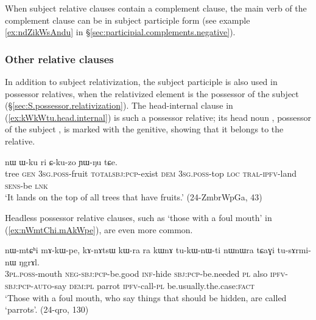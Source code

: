 
When subject relative clauses contain a complement clause, the main verb of the complement clause can be in subject participle form (see example \ref{ex:ndZikWsAndu}  in §\ref{sec:participial.complements.negative}).
 
\subsubsection{Other relative clauses}  \label{sec:subject.participle.other.relative}
In addition to subject relativization, the subject participle is also used in possessor relatives, when the relativized element is the possessor of the subject (§\ref{sec:S.possessor.relativization}).  The head-internal clause in (\ref{ex:kWkWtu.head.internal}) is such a possessor relative; its head noun , possessor of the subject ,  is marked with the genitive, showing that it belongs to the relative.  

\begin{exe}
\ex \label{ex:kWkWtu.head.internal}
  nɯ ɯ-ku ri ɕ-ku-zo ɲɯ-ŋu tɕe. \\
 tree \textsc{gen} \textsc{3sg}.\textsc{poss}-fruit \textsc{total}\redp{}\textsc{sbj}:\textsc{pcp}-exist \textsc{dem} \textsc{3sg}.\textsc{poss}-top \textsc{loc} \textsc{tral}-\textsc{ipfv}-land \textsc{sens}-be \textsc{lnk} \\
 \glt `It lands on the top of all trees that have fruits.' (24-ZmbrWpGa, 43)
\end{exe}

 Headless possessor relative clauses, such as   `those with a foul mouth' in (\ref{ex:nWmtChi.mAkWpe}), are even more common.

\begin{exe}
\ex \label{ex:nWmtChi.mAkWpe}
\gll nɯ-mtɕʰi mɤ-kɯ-pe, kɤ-nɤtsɯ kɯ-ra ra kɯnɤ tu-kɯ-nɯ-ti nɯnɯra tɕaɣi tu-sɤrmi-nɯ ŋgrɤl. \\
 \textsc{3pl}.\textsc{poss}-mouth \textsc{neg}-\textsc{sbj}:\textsc{pcp}-be.good \textsc{inf}-hide \textsc{sbj}:\textsc{pcp}-be.needed \textsc{pl} also \textsc{ipfv}-\textsc{sbj}:\textsc{pcp}-\textsc{auto}-say \textsc{dem}:\textsc{pl} parrot \textsc{ipfv}-call-\textsc{pl} be.usually.the.case:\textsc{fact} \\
 \glt `Those with a foul mouth, who say things that should be hidden, are called `parrots'. (24-qro, 130)
\end{exe}
 
